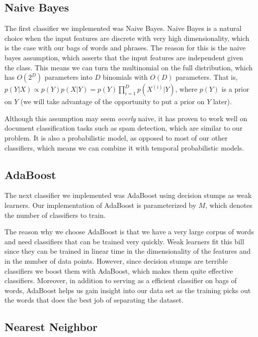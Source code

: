 \documentclass[10pt, twocolumn]{article}
\begin{document}
\subsection{Naive Bayes}
\label{sec:naive-bayes}

The first classifier we implemented was Naive Bayes.
Naive Bayes is a natural choice when the input features are discrete with very high dimensionality, which is the case with our bags of words and phrases.
The reason for this is the naive bayes assumption, which asserts that the input features are independent given the class.
This means we can turn the multinomial on the full distribution, which has $O(2^D)$ parameters into $D$ binomials with $O(D)$ parameters.
That is, $p(Y|X) \propto p(Y)p(X|Y) = p(Y)\prod_{i=1}^{D}{p(X^{(i)}|Y)}$, where $p(Y)$ is a prior on $Y$ (we will take advantage of the opportunity to put a prior on $Y$ later).

Although this assumption may seem \emph{overly} naive, it has proven to work well on document classification tasks such as spam detection, which are similar to our problem.
It is also a probabilistic model, as opposed to most of our other classifiers, which means we can combine it with temporal probabilistic models.

\subsection{AdaBoost}
\label{sec:adaboost}

The next classifier we implemented was AdaBoost using decision stumps as weak learners.
Our implementation of AdaBoost is parameterized by $M$, which denotes the number of classifiers to train.

The reason why we choose AdaBoost is that we have a very large corpus of words and need classifiers that can be trained very quickly.
Weak learners fit this bill since they can be trained in linear time in the dimensionality of the features and in the number of data points.
However, since decision stumps are terrible classifiers we boost them with AdaBoost, which makes them quite effective classifiers.
Moreover, in addition to serving as a efficient classifier on bags of words, AdaBoost helps us gain insight into our data set as the training picks out the words that does the best job of separating the dataset.

\subsection{Nearest Neighbor}
\label{sec:nearest-neighbor}
\end{document}
